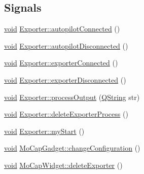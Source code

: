 \subsection*{\-Signals}
\begin{DoxyCompactItemize}
\item 
\hyperlink{group___u_a_v_objects_plugin_ga444cf2ff3f0ecbe028adce838d373f5c}{void} \hyperlink{group___mo_cap_plugin_ga52a7d20152fb6923f10c6940a7286396}{\-Exporter\-::autopilot\-Connected} ()
\item 
\hyperlink{group___u_a_v_objects_plugin_ga444cf2ff3f0ecbe028adce838d373f5c}{void} \hyperlink{group___mo_cap_plugin_ga94d2323c5abe7b5fb873f894f1115462}{\-Exporter\-::autopilot\-Disconnected} ()
\item 
\hyperlink{group___u_a_v_objects_plugin_ga444cf2ff3f0ecbe028adce838d373f5c}{void} \hyperlink{group___mo_cap_plugin_gab2bac0f39a4f396ad4d99829d85ca4d9}{\-Exporter\-::exporter\-Connected} ()
\item 
\hyperlink{group___u_a_v_objects_plugin_ga444cf2ff3f0ecbe028adce838d373f5c}{void} \hyperlink{group___mo_cap_plugin_gae4dad27cecdf9ed206a7ebb5b711a23d}{\-Exporter\-::exporter\-Disconnected} ()
\item 
\hyperlink{group___u_a_v_objects_plugin_ga444cf2ff3f0ecbe028adce838d373f5c}{void} \hyperlink{group___mo_cap_plugin_gafcdca00f55b093906997cc158f7fa39c}{\-Exporter\-::process\-Output} (\hyperlink{group___u_a_v_objects_plugin_gab9d252f49c333c94a72f97ce3105a32d}{\-Q\-String} str)
\item 
\hyperlink{group___u_a_v_objects_plugin_ga444cf2ff3f0ecbe028adce838d373f5c}{void} \hyperlink{group___mo_cap_plugin_gaced02c5dc9cdfc8e07c7be1b3ea03d4f}{\-Exporter\-::delete\-Exporter\-Process} ()
\item 
\hyperlink{group___u_a_v_objects_plugin_ga444cf2ff3f0ecbe028adce838d373f5c}{void} \hyperlink{group___mo_cap_plugin_ga8588f1bba3155708a434f543372d7f7d}{\-Exporter\-::my\-Start} ()
\item 
\hyperlink{group___u_a_v_objects_plugin_ga444cf2ff3f0ecbe028adce838d373f5c}{void} \hyperlink{group___mo_cap_plugin_gacbc122d8949ff735984095e5d5bcce1b}{\-Mo\-Cap\-Gadget\-::change\-Configuration} ()
\item 
\hyperlink{group___u_a_v_objects_plugin_ga444cf2ff3f0ecbe028adce838d373f5c}{void} \hyperlink{group___mo_cap_plugin_ga34afe7fdc30edaad2ec82fdb72275fa8}{\-Mo\-Cap\-Widget\-::delete\-Exporter} ()
\end{DoxyCompactItemize}

